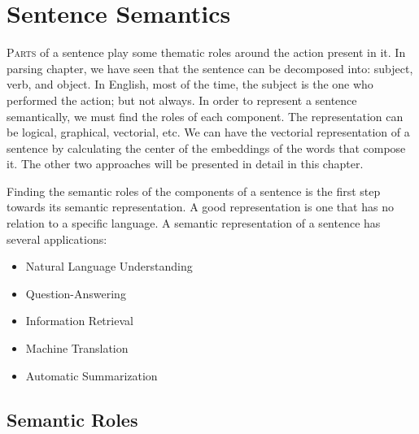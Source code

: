 \documentclass{KBook}
\begin{document}
		\mainmatter
	
\fi

\chapter{Sentence Semantics}

\begin{introduction}
	\lettrine{P}{arts} of a sentence play some thematic roles around the action present in it.
	In parsing chapter, we have seen that the sentence can be decomposed into: subject, verb, and object.
	In English, most of the time, the subject is the one who performed the action; but not always.
	In order to represent a sentence semantically, we must find the roles of each component.
	The representation can be logical, graphical, vectorial, etc.
	We can have the vectorial representation of a sentence by calculating the center of the embeddings of the words that compose it.
	The other two approaches will be presented in detail in this chapter.
\end{introduction} 


Finding the semantic roles of the components of a sentence is the first step towards its semantic representation.
A good representation is one that has no relation to a specific language.
A semantic representation of a sentence has several applications:
\begin{itemize}
	\item Natural Language Understanding
	\item Question-Answering
	\item Information Retrieval
	\item Machine Translation
	\item Automatic Summarization
\end{itemize}


\section{Semantic Roles}
\end{document}
